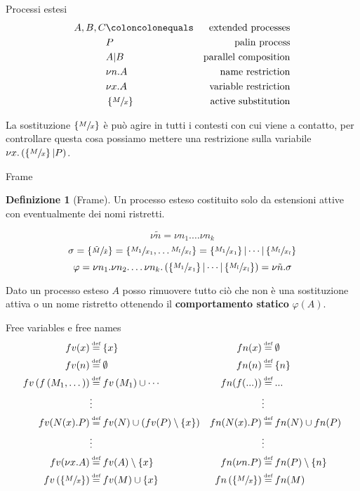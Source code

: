 \documentclass{beamer}
\newcounter{counter1}
\theoremstyle{plain}
\theoremstyle{definition}
\newtheorem{mydef}[counter1]{Definizione}
\theoremstyle{remark}
\newcommand{\set}[1]{\left\{#1\right\}}
\newcommand{\pa}[1]{\left(#1\right)}
\newcommand*{\eqdef}{\ensuremath{\overset{\mathclap{\text{\tiny def}}}{=}}}
\begin{document}
\begin{frame}{Processi estesi}
  \begin{align*}
    A,B,C & \coloncolonequals & \text{extended processes} \\
          & P & \text{palin process} \\
          & A | B & \text{parallel composition} \\
          & \nu n.A & \text{name restriction} \\
          & \nu x.A & \text{variable restriction} \\
          & \left\{ \sfrac{M}{x} \right\} & \text{active substitution}
  \end{align*}
  
  La sostituzione $\left\{ \sfrac{M}{x} \right\}$ \`e pu\`o agire in
  tutti i contesti con cui viene a contatto, per controllare questa cosa
  possiamo mettere una restrizione sulla variabile $\nu x.\left( \left\{
      \sfrac{M}{x} \right\} | P\right)$.
\end{frame}

\begin{frame}{Frame}
  \begin{mydef}[Frame]
    Un processo esteso costituito solo da estensioni attive con
    eventualmente dei nomi ristretti.
  \end{mydef}
  \[ \nu \tilde n = \nu n_1. \dots \nu n_k \]
  \[ \sigma = \set{ \sfrac{\tilde M}{\tilde x}} = \set{
      \sfrac{M_1}{x_1}, \dots \sfrac{M_l}{x_l}} = \set{
      \sfrac{M_1}{x_1}}| \cdots | \set{\sfrac{M_l}{x_l}} \]
  \[ \varphi = \nu n_1.\nu n_2.\dots \nu n_k . \pa{ \set{
        \sfrac{M_1}{x_1}}| \cdots | \set{\sfrac{M_l}{x_l}}} = \nu
    \tilde n. \sigma \]
  \vfill

  Dato un processo esteso $A$ posso rimuovere tutto ci\`o che non \`e
  una sostituzione attiva o un nome ristretto ottenendo il
  \textbf{comportamento statico} $\varphi(A)$.
\end{frame}

\begin{frame}{Free variables e free names}
  \begin{align*}
    fv(x) & \eqdef \set{x} & fn(x) & \eqdef \emptyset \\
    fv(n) & \eqdef \emptyset &  fn(n) & \eqdef \set{n} \\
    fv\pa{f\pa{ M_1, \dots }} & \eqdef fv\pa{M_1} \cup \cdots  & fn(f(...)) & \eqdef ... \\
          & \vdots & &\vdots  \\
    fv(N(x).P) & \eqdef fv(N) \cup \pa{fv(P) \setminus \set{x}} &   fn(N(x).P) & \eqdef fn(N) \cup fn(P) \\
          & \vdots & & \vdots \\
    fv(\nu x.A) & \eqdef fv(A) \setminus \set{x} &   fn(\nu n.P) & \eqdef fn(P)\setminus \set{n} \\
    fv\pa{ \set{ \sfrac{M}{x} } } & \eqdef fv(M) \cup \set{x} & fn\pa{ \set{ \sfrac{M}{x} } } & \eqdef fn(M) \\
  \end{align*}
\end{frame}
\end{document}
